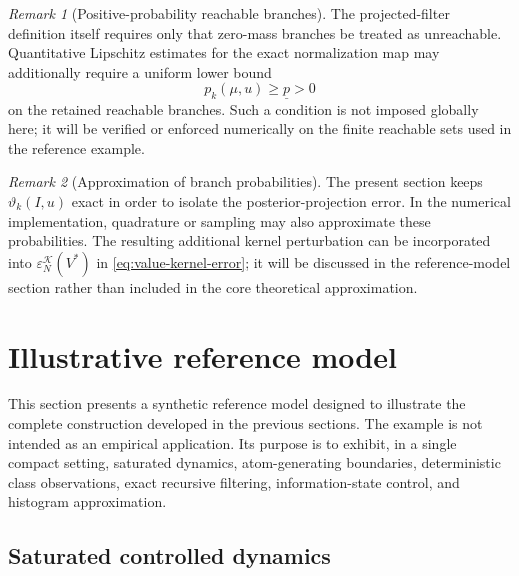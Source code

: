 \documentclass[10pt,twocolumn]{article}
\theoremstyle{remark}
\newtheorem{remark}{Remark}
\begin{document}
\begin{remark}[Positive-probability reachable branches]
	\label{rem:positive-branch-approximation}
	The projected-filter definition itself requires only that zero-mass branches be treated as unreachable. Quantitative Lipschitz estimates for the exact normalization map may additionally require a uniform lower bound
	\[
	p_k(\mu,u)\geq\underline p>0
	\]
	on the retained reachable branches. Such a condition is not imposed globally here; it will be verified or enforced numerically on the finite reachable sets used in the reference example.
\end{remark}

\begin{remark}[Approximation of branch probabilities]
	\label{rem:approximated-branch-probabilities}
	The present section keeps \(\vartheta_k(I,u)\) exact in order to isolate the posterior-projection error. In the numerical implementation, quadrature or sampling may also approximate these probabilities. The resulting additional kernel perturbation can be incorporated into \(\varepsilon_N^{\mathcal K}(V^*)\) in \cref{eq:value-kernel-error}; it will be discussed in the reference-model section rather than included in the core theoretical approximation.
\end{remark}

%
%

\section{Illustrative reference model}
\label{sec:reference-model}

This section presents a synthetic reference model designed to illustrate the complete construction developed in the previous sections. The example is not intended as an empirical application. Its purpose is to exhibit, in a single compact setting, saturated dynamics, atom-generating boundaries, deterministic class observations, exact recursive filtering, information-state control, and histogram approximation.

\subsection{Saturated controlled dynamics}
\label{subsec:saturated-controlled-dynamics}
\end{document}
